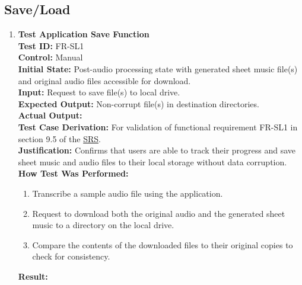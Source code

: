 \documentclass[12pt, titlepage]{article}
\begin{document}
  \subsection{Save/Load}
  \begin{enumerate}
    \item \textbf{Test Application Save Function} \\
      \newline
      \textbf{Test ID:} FR-SL1 \\
      \textbf{Control:} Manual \\
      \textbf{Initial State:} Post-audio processing state with generated sheet music file(s) and original audio files accessible 
      for download. \\
      \textbf{Input:} Request to save file(s) to local drive. \\
      \textbf{Expected Output:} Non-corrupt file(s) in destination directories. \\
      \textbf{Actual Output:} \\
      \textbf{Test Case Derivation:} For validation of functional requirement FR-SL1 in section 9.5 of the 
      \href{https://github.com/emilyperica/ScoreGen/blob/main/docs/SRS-Volere/SRS.pdf}{SRS}. \\
      \textbf{Justification:} Confirms that users are able to track their progress and save sheet music and audio files to their local 
      storage without data corruption.\\
      \textbf{How Test Was Performed:}
      \begin{enumerate}
          \item Transcribe a sample audio file using the application.
          \item Request to download both the original audio and the generated sheet music to a directory on the local drive.
          \item Compare the contents of the downloaded files to their original copies to check for consistency.
      \end{enumerate}
      \textbf{Result:}
    

\end{enumerate}
\end{document}
